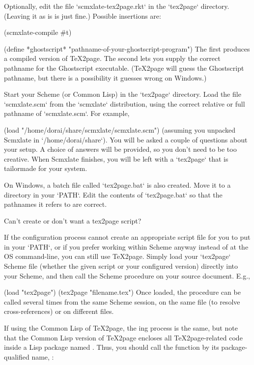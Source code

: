 Optionally, edit the file `scmxlate-tex2page.rkt` in the
`tex2page` directory. (Leaving it as is is just fine.)
Possible insertions are:

\begintts
(scmxlate-compile #t)

(define *ghostscript* "pathname-of-your-ghostscript-program")
\endtt
%
The first produces a compiled version of
\TeX2page.   The second lets you supply the
correct pathname for the Ghostscript executable.
(\TeX2page will guess the Ghostscript pathname,
but there is a possibility it guesses wrong on
Windows.)

Start your Scheme (or Common Lisp) in the
`tex2page` directory.   Load the file
`scmxlate.scm` from the
`scmxlate` distribution, using the correct relative
or full pathname of `scmxlate.scm`.  For example,

\begintts
(load "/home/dorai/share/scmxlate/scmxlate.scm")
\endtt
%
(assuming you unpacked Scmxlate in
`/home/dorai/share`).  You will be asked a couple
of questions about your setup.  A choice of answers
will be provided, so you don’t need to be too creative.
When Scmxlate finishes, you will be left with a
`tex2page` that is tailormade for your system.

On Windows, a batch file called `tex2page.bat`
is also created.  Move it to a directory in your
`PATH`.  Edit the contents of `tex2page.bat` so
that the pathnames it refers to are correct.

\iffalse
\beginsection Can’t create or don’t want a {tex2page
script?}

If the configuration process cannot create an
appropriate script file for you to put in your
`PATH`, or if you prefer working within Scheme
anyway instead of at the OS command-line,
you can still use \TeX2page.  Simply load
your `tex2page` Scheme file
(whether the given script or your configured version)
directly into
your Scheme, and then call the Scheme
procedure  on your source document.  E.g.,

\begintts
(load "tex2page")
(tex2page "filename.tex")
\endtt
Once loaded, the procedure  can be called several times from
the same Scheme session, on the same file (to resolve cross-references)
or on different files.

If using the Common Lisp of \TeX2page, the ing process is the same, but note that
the Common Lisp version of \TeX2page encloses all \TeX2page-related code
inside a Lisp package named .  Thus, you should call the
function  by its package-qualified name, :

